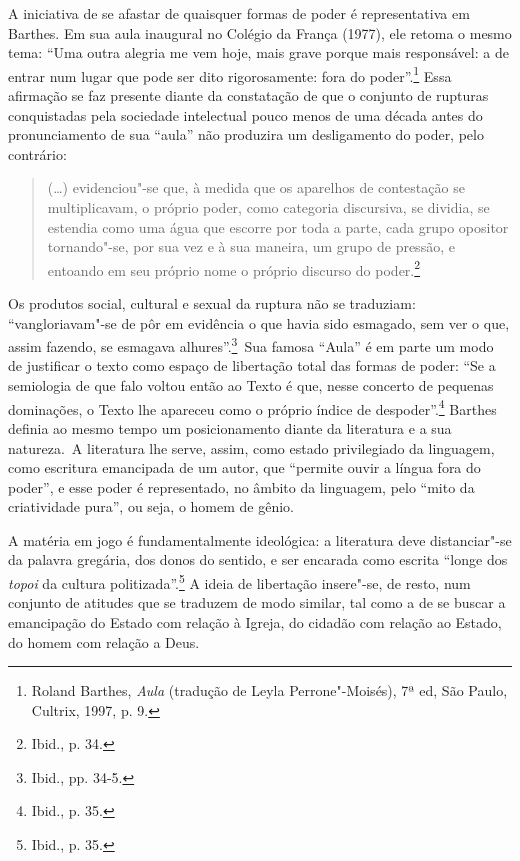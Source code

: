 A iniciativa de se afastar de quaisquer formas de poder é representativa
em Barthes. Em sua aula inaugural no Colégio da França (1977), ele
retoma o mesmo tema: ``Uma outra alegria me vem hoje, mais grave porque
mais responsável: a de entrar num lugar que pode ser dito rigorosamente:
fora do poder''.\footnote{Roland Barthes, \emph{Aula} (tradução de Leyla
  Perrone"-Moisés), 7ª ed, São Paulo, Cultrix, 1997, p.
  9.} Essa afirmação se faz presente diante da constatação de que o
conjunto de rupturas conquistadas pela sociedade intelectual pouco menos
de uma década antes do pronunciamento de sua ``aula'' não produzira um
desligamento do poder, pelo contrário:

\begin{quote}
(\ldots{}) evidenciou"-se que, à medida que os aparelhos de contestação se
multiplicavam, o próprio poder, como categoria discursiva, se dividia,
se estendia como uma água que escorre por toda a parte, cada grupo
opositor tornando"-se, por sua vez e à sua maneira, um grupo de pressão,
e entoando em seu próprio nome o próprio discurso do poder.\footnote{Ibid.,
  p. 34.}
\end{quote}

Os produtos social, cultural e sexual da ruptura não se traduziam:
``vangloriavam"-se de pôr em evidência o que havia sido esmagado, sem ver
o que, assim fazendo, se esmagava alhures''.\footnote{Ibid., pp. 34-5.}~Sua famosa ``Aula'' é em parte um modo de justificar o texto como espaço de libertação total das formas de poder: ``Se a semiologia de que falo
voltou então ao Texto é que, nesse concerto de pequenas dominações, o
Texto lhe apareceu como o próprio índice de despoder''.\footnote{Ibid.,
  p. 35.} Barthes definia ao mesmo tempo um posicionamento diante da
literatura e a sua natureza.~A literatura lhe serve, assim, como estado
privilegiado da linguagem, como escritura emancipada de um autor, que
``permite ouvir a língua fora do poder'', e esse poder é representado,
no âmbito da linguagem, pelo ``mito da criatividade pura'', ou seja, o
homem de gênio.

A matéria em jogo é fundamentalmente ideológica: a literatura deve
distanciar"-se da palavra gregária, dos donos do sentido, e ser encarada
como escrita ``longe dos \emph{topoi} da cultura politizada''.\footnote{Ibid.,
  p. 35.} A ideia de libertação insere"-se, de resto, num conjunto de
atitudes que se traduzem de modo similar, tal como a de se buscar a
emancipação do Estado com relação à Igreja, do cidadão com relação ao
Estado, do homem com relação a Deus.

